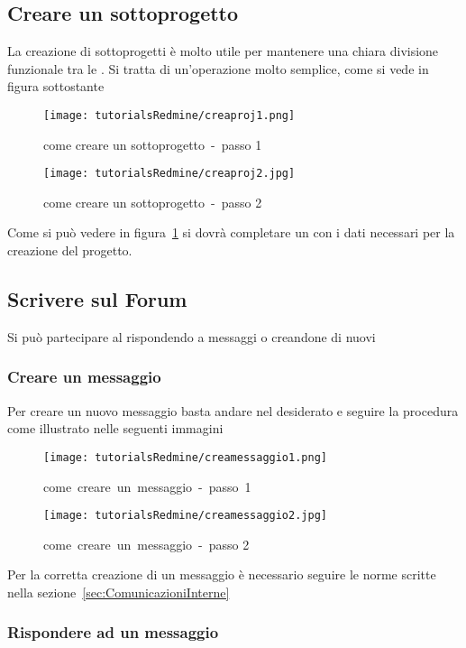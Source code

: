 \documentclass{scalatekids-article}
\begin{document}
\subsection{Creare un sottoprogetto}

La creazione di sottoprogetti è molto utile per mantenere una chiara divisione funzionale tra le . Si tratta di un'operazione molto semplice, come si vede in figura sottostante
\begin{figure}[H]
  \centering
  \texttt{[image: tutorialsRedmine/creaproj1.png]}
  \caption{come creare un sottoprogetto\ -\ passo 1}
\end{figure}
\begin{figure}[H]
  \centering
  \texttt{[image: tutorialsRedmine/creaproj2.jpg]}
  \caption{come creare un sottoprogetto\ -\ passo 2\label{fig:figura-2}}
\end{figure}
Come si può vedere in figura~\ref{fig:figura-2} si dovrà completare un  con i dati necessari per la creazione del progetto.

\subsection{Scrivere sul Forum}

Si può partecipare al  rispondendo a messaggi o creandone di nuovi

\subsubsection{Creare un messaggio}

Per creare un nuovo messaggio basta andare nel  desiderato e seguire la procedura come illustrato nelle seguenti immagini
\begin{figure}[H]
  \centering
  \texttt{[image: tutorialsRedmine/creamessaggio1.png]}
  \caption{come\ creare\ un\ messaggio\ -\ passo\ 1}
\end{figure}
\begin{figure}[H]
  \centering
  \texttt{[image: tutorialsRedmine/creamessaggio2.jpg]}
  \caption{come\ creare\ un\ messaggio\ -\ passo 2}
\end{figure}
Per la corretta creazione di un messaggio è necessario seguire le norme scritte nella sezione~\ref{sec:ComunicazioniInterne}

\subsubsection{Rispondere ad un messaggio}
\end{document}
